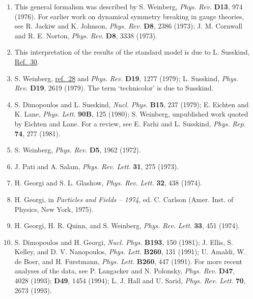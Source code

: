\begin{enumerate}
\item {}\label{ch21-ref-28}
This general formalism was described by S. Weinberg, \emph{Phys. Rev.}
\textbf{D13}, 974 (1976). For earlier work on dynamical symmetry breaking
in gauge theories, see R. Jackiw and K. Johnson, \emph{Phys. Rev.}
\textbf{D8}, 2386 (1973); J. M. Cornwall and R. E. Norton,
\emph{Phys. Rev.} \textbf{D8}, 3338 (1973).

\item {}\label{ch21-ref-29}
This interpretation of the results of the standard model is due to
L. Susskind, \hyperref[ch21-ref-30]{Ref.~30}.

\item {}\label{ch21-ref-30}
S. Weinberg, \hyperref[ch21-ref-28]{ref.~28} and \emph{Phys. Rev.}
\textbf{D19}, 1277 (1979); L. Susskind, \emph{Phys. Rev.} \textbf{D19},
2619 (1979). The term `technicolor' is due to Susskind.

\item {}\label{ch21-ref-31}
S. Dimopoulos and L. Susskind, \emph{Nucl. Phys.} \textbf{B15}, 237
(1979); E. Eichten and K. Lane, \emph{Phys. Lett.} \textbf{90B}, 125
(1980); S. Weinberg, unpublished work quoted by Eichten and Lane. For a
review, see E. Farhi and L. Susskind, \emph{Phys. Rep.} \textbf{74}, 277
(1981).

\item {}\label{ch21-ref-32}
S. Weinberg, \emph{Phys. Rev.} \textbf{D5}, 1962 (1972).

\item {}\label{ch21-ref-33}
J. Pati and A. Salam, \emph{Phys. Rev. Lett.} \textbf{31}, 275 (1973).

\item {}\label{ch21-ref-34}
H. Georgi and S. L. Glashow, \emph{Phys. Rev. Lett.} \textbf{32}, 438
(1974).

\item {}\label{ch21-ref-35}
H. Georgi, in \emph{Particles and Fields -- 1974}, ed. C. Carlson
(Amer. Inst. of Physics, New York, 1975).

\item {}\label{ch21-ref-36}
H. Georgi, H. R. Quinn, and S. Weinberg, \emph{Phys. Rev. Lett.}
\textbf{33}, 451 (1974).

\item[36a.] \label{ch21-ref-36a}
S. Dimopoulos and H. Georgi, \emph{Nucl. Phys.} \textbf{B193}, 150
(1981); J. Ellis, S. Kelley, and D. V. Nanopoulos, \emph{Phys. Lett.}
\textbf{B260}, 131 (1991); U. Amaldi, W. de Boer, and H. Furstmann,
\emph{Phys. Lett.} \textbf{B260}, 447 (1991). For more recent analyses of
the data, see P. Langacker and N. Polonsky, \emph{Phys. Rev.} \textbf{D47},
4028 (1993); \textbf{D49}, 1454 (1994); L. J. Hall and U. Sarid,
\emph{Phys. Rev. Lett.} \textbf{70}, 2673 (1993).


\end{enumerate}
